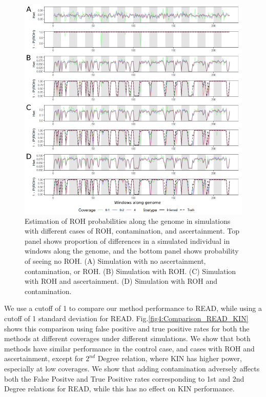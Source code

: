 \documentclass[12pt, letterpaper]{article}
\begin{document}
\begin{figure}[h!]
    \includegraphics[width=16cm]{plots/inkscape_finalImg/ROHplot_final.png}
    \centering
    \caption{Estimation of ROH probabilities along the genome in simulations with different cases of ROH, contamination, and ascertainment. Top panel shows proportion of differences in a simulated individual in windows along the genome, and the bottom panel shows probability of seeing no ROH. (A) Simulation with no ascertainment, contamination, or ROH. (B) Simulation with ROH. (C) Simulation with ROH and ascertainment. (D) Simulation with ROH and contamination.}
    \label{fig2:ROH}
\end{figure}
We use a cutoff of 1 to compare our method performance to READ, while using a cutoff of 1 standard deviation for READ. Fig.\ref{fig4:Comparison_READ_KIN} shows this comparison using false positive and true positive rates for both the methods at different coverages under different simulations. We show that both methods have similar performance in the control case, and cases with ROH and ascertainment, except for $2^{nd}$ Degree relation, where KIN has higher power, especially at low coverages. We show that adding contamination adversely affects both the False Positve and True Positive rates corresponding to 1st and 2nd Degree relations for READ, while this has no effect on KIN performance.
\end{document}
